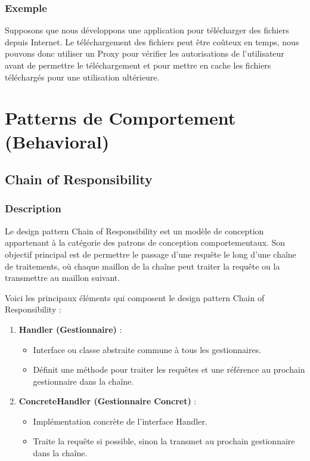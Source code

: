 \documentclass[french]{article}
\begin{document}
\subsubsection{Exemple}

Supposons que nous développons une application pour télécharger des fichiers depuis Internet. Le téléchargement des fichiers peut être coûteux en temps, nous pouvons donc utiliser un Proxy pour vérifier les autorisations de l'utilisateur avant de permettre le téléchargement et pour mettre en cache les fichiers téléchargés pour une utilisation ultérieure.




\newpage

\section{Patterns de Comportement (Behavioral)}

\subsection{Chain of Responsibility}

\subsubsection{Description}

Le design pattern Chain of Responsibility est un modèle de conception appartenant à la catégorie des patrons de conception comportementaux. Son objectif principal est de permettre le passage d'une requête le long d'une chaîne de traitements, où chaque maillon de la chaîne peut traiter la requête ou la transmettre au maillon suivant.

Voici les principaux éléments qui composent le design pattern Chain of Responsibility :

\begin{enumerate}
    \item \textbf{Handler (Gestionnaire)} :
    \begin{itemize}
        \item Interface ou classe abstraite commune à tous les gestionnaires.
        \item Définit une méthode pour traiter les requêtes et une référence au prochain gestionnaire dans la chaîne.
    \end{itemize}
    
    \item \textbf{ConcreteHandler (Gestionnaire Concret)} :
    \begin{itemize}
        \item Implémentation concrète de l'interface Handler.
        \item Traite la requête si possible, sinon la transmet au prochain gestionnaire dans la chaîne.
    \end{itemize}
\end{enumerate}
\end{document}
